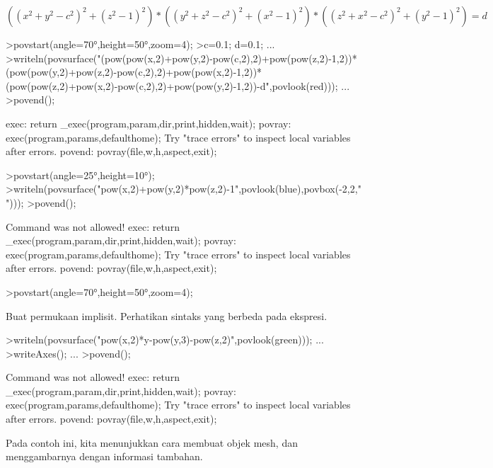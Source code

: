 \documentclass[a4paper,10pt]{article}
\begin{document}
\begin{eulernotebook}
\begin{eulercomment}
\end{eulercomment}
\begin{eulerformula}
\[
((x^2+y^2-c^2)^2+(z^2-1)^2)*((y^2+z^2-c^2)^2+(x^2-1)^2)*((z^2+x^2-c^2)^2+(y^2-1)^2)=d
\]
\end{eulerformula}
\begin{eulerprompt}
>povstart(angle=70°,height=50°,zoom=4);
>c=0.1; d=0.1; ...
>writeln(povsurface("(pow(pow(x,2)+pow(y,2)-pow(c,2),2)+pow(pow(z,2)-1,2))*(pow(pow(y,2)+pow(z,2)-pow(c,2),2)+pow(pow(x,2)-1,2))*(pow(pow(z,2)+pow(x,2)-pow(c,2),2)+pow(pow(y,2)-1,2))-d",povlook(red))); ...
>povend();
\end{eulerprompt}
\begin{euleroutput}
  exec:
      return _exec(program,param,dir,print,hidden,wait);
  povray:
      exec(program,params,defaulthome);
  Try "trace errors" to inspect local variables after errors.
  povend:
      povray(file,w,h,aspect,exit); 
\end{euleroutput}
\begin{eulerprompt}
>povstart(angle=25°,height=10°); 
>writeln(povsurface("pow(x,2)+pow(y,2)*pow(z,2)-1",povlook(blue),povbox(-2,2,"")));
>povend();
\end{eulerprompt}
\begin{euleroutput}
  Command was not allowed!
  exec:
      return _exec(program,param,dir,print,hidden,wait);
  povray:
      exec(program,params,defaulthome);
  Try "trace errors" to inspect local variables after errors.
  povend:
      povray(file,w,h,aspect,exit); 
\end{euleroutput}
\begin{eulerprompt}
>povstart(angle=70°,height=50°,zoom=4);
\end{eulerprompt}
\begin{eulercomment}
Buat permukaan implisit. Perhatikan sintaks yang berbeda pada ekspresi.
\end{eulercomment}
\begin{eulerprompt}
>writeln(povsurface("pow(x,2)*y-pow(y,3)-pow(z,2)",povlook(green))); ...
>writeAxes(); ...
>povend();
\end{eulerprompt}
\begin{euleroutput}
  Command was not allowed!
  exec:
      return _exec(program,param,dir,print,hidden,wait);
  povray:
      exec(program,params,defaulthome);
  Try "trace errors" to inspect local variables after errors.
  povend:
      povray(file,w,h,aspect,exit); 
\end{euleroutput}
\begin{eulercomment}
Pada contoh ini, kita menunjukkan cara membuat objek mesh, dan menggambarnya dengan informasi tambahan.


\end{eulercomment}
\end{eulernotebook}
\end{document}
